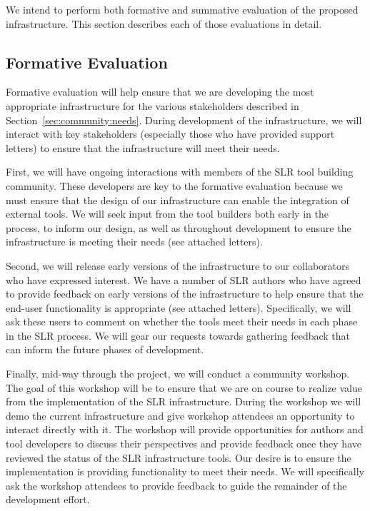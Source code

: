 We intend to perform both formative and summative evaluation of the proposed infrastructure. 
This section describes each of those evaluations in detail.

\subsection{Formative Evaluation}
Formative evaluation will help ensure that we are developing the most appropriate infrastructure for the various stakeholders described in Section~\ref{sec:community:needs}.
During development of the infrastructure, we will interact with key stakeholders (especially those who have provided support letters) to ensure that the infrastructure will meet their needs.

First, we will have ongoing interactions with members of the SLR tool building community.
These developers are key to the formative evaluation because we must ensure that the design of our infrastructure can enable the integration of external tools.
We will seek input from the tool builders both early in the process, to inform our design, as well as throughout development to ensure the infrastructure is meeting their needs (see attached letters).

Second, we will release early versions of the infrastructure to our collaborators who have expressed interest.
We have a number of SLR authors who have agreed to provide feedback on early versions of the infrastructure to help ensure that the end-user functionality is appropriate (see attached letters).
Specifically, we will ask these users to comment on whether the tools meet their needs in each phase in the SLR process.
We will gear our requests towards gathering feedback that can inform the future phases of development. 

Finally, mid-way through the project, we will conduct a community workshop. 
The goal of this workshop will be to ensure that we are on course to realize value from the implementation of the SLR infrastructure. 
During the workshop we will demo the current infrastructure and give workshop attendees an opportunity to interact directly with it. 
The workshop will provide opportunities for authors and tool developers to discuss their perspectives and provide feedback once they have reviewed the status of the SLR infrastructure tools.  
Our desire is to ensure the implementation is providing functionality to meet their needs.
We will specifically ask the workshop attendees to provide feedback to guide the remainder of the development effort.

